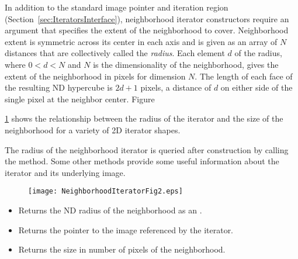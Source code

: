 In addition to the standard image pointer and iteration region
(Section~\ref{sec:IteratorsInterface}), neighborhood iterator constructors
require an argument that specifies the extent of the neighborhood to cover.
Neighborhood extent is symmetric across its center in each
axis and is given as an array of $N$ distances that are collectively called the
\emph{radius}. Each element $d$ of the radius, where $0 < d < N$ and
$N$ is the dimensionality of the neighborhood, gives the extent of the
neighborhood in pixels for dimension $N$.  The length of each face of the
resulting ND hypercube is $2d + 1$ pixels, a distance of $d$ on either side of
the single pixel at the neighbor center.
Figure~{\ref{fig:NeighborhoodIteratorFig2} shows the relationship between the
radius of the iterator and the size of the neighborhood for a variety of 2D
iterator shapes.

The radius of the neighborhood iterator is queried after construction
by calling the  method.  Some other methods provide
some useful information about the iterator and its underlying image.

\begin{figure}
\centering
\texttt{[image: NeighborhoodIteratorFig2.eps]}
\protect\label{fig:NeighborhoodIteratorFig2}
\end{figure}

\begin{itemize}

\item \textbf{} Returns the ND radius of the
neighborhood as an .

\item \textbf{} Returns the pointer to
the image referenced by the iterator.

\item \textbf{} Returns the size in number of 
pixels of the neighborhood.

\end{itemize}

}
